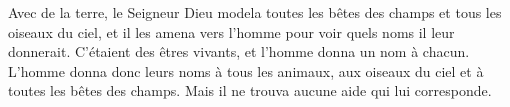 Avec de la terre, le Seigneur Dieu modela toutes les bêtes des champs
		et tous les oiseaux du ciel,
	et il les amena vers l’homme pour voir quels noms il leur donnerait.
C’étaient des êtres vivants, et l’homme donna un nom à chacun.
L’homme donna donc leurs noms à tous les animaux,
	aux oiseaux du ciel et à toutes les bêtes des champs.
	Mais il ne trouva aucune aide qui lui corresponde.
